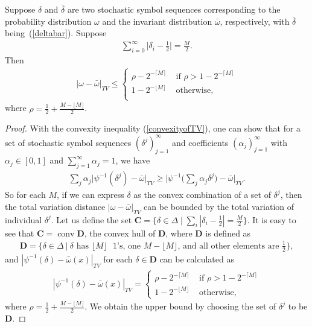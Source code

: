 \documentclass[final]{siamltex}
\begin{document}
\begin{theorem}
  \label{theoremub}Suppose $\delta$ and $\bar{\delta}$ are two
  stochastic symbol sequences corresponding to the probability
  distribution $\omega$ and the invariant distribution $\bar{\omega}$,
  respectively, with $\bar{\delta}$ being~(\ref{deltabar}). Suppose
  \begin{align}
    \sum_{i=0}^\infty \Big|\delta_i - \frac{1}{2}\Big| = \frac{M}{2}.
  \end{align}
  Then    
  \begin{align}
    |\omega-\bar{\omega}|_{TV} \le \begin{cases}
      \rho - 2^{-\lceil M \rceil } &\text{ if } \rho>1-2^{-\lceil M \rceil }\\
      1-2^{-\lfloor M \rfloor}    &\text{ otherwise},\\
    \end{cases} 
  \end{align}
  where $\rho = \frac{1}{2} +  \frac{M-\lfloor M \rfloor}{2}$.
\end{theorem}
\begin{proof}
  With the convexity inequality (\ref{convexityofTV}), one can show
  that for a set of stochastic symbol sequences
  $(\delta^j)_{j=1}^\infty$ and coefficients $(\alpha_j)_{j=1}^\infty$
  with $\alpha_j \in [0,1]$ and $\sum_{j=1}^\infty \alpha_j = 1$, we
  have
  \begin{align}
    \sum_j \alpha_j\Big|\psi^{-1}(\delta^j)-\bar{\omega}\Big|_{TV} \ge
    \bigg|\psi^{-1}\Big(\sum_j \alpha_j \delta^j\Big)-\bar{\omega}\bigg|_{TV}.
  \end{align}
  So for each $M$, if we can express $\delta$ as the convex
  combination of a set of $\delta^j$, then the total variation
  distance $|\omega-\bar{\omega}|_{TV}$ can be bounded by the total
  variation of individual $\delta^j$. Let us define the set
  $\mathbf{C} = \{\delta \in \Delta \mid \sum_i|\delta_i-\frac{1}{2}|
  = \frac{M}{2}\}$. It is easy to see that $\mathbf{C} =
  \operatorname{conv} \mathbf{D}$, the convex hull of $\mathbf{D}$,
  where $\mathbf{D}$ is defined as
  \begin{align}
    \mathbf{D}=\Big\{\delta \in \Delta \ \Big|\ \delta \text{ has } \lfloor M \rfloor
    \text{ } 1\text{'s, one } M-\lfloor M \rfloor \text{, and all
      other elements are }\frac{1}{2} \Big\},
  \end{align}
  and $|\psi^{-1}(\delta)-\bar{\omega}(x)|_{TV}$ for each $\delta \in
  \mathbf{D}$ can be calculated as
  \begin{align}
    |\psi^{-1}(\delta)-\bar{\omega}(x)|_{TV} =
    \begin{cases}
      \rho - 2^{-\lceil M \rceil } &\text{ if } \rho>1-2^{-\lceil M \rceil }\\
      1-2^{-\lfloor M \rfloor} &\text{ otherwise},
    \end{cases}
  \end{align}
  where $\rho = \frac{1}{2} + \frac{M-\lfloor M \rfloor}{2}$. We
  obtain the upper bound by choosing the set of $\delta^j$ to be
  $\mathbf{D}$.
\end{proof}
\end{document}
